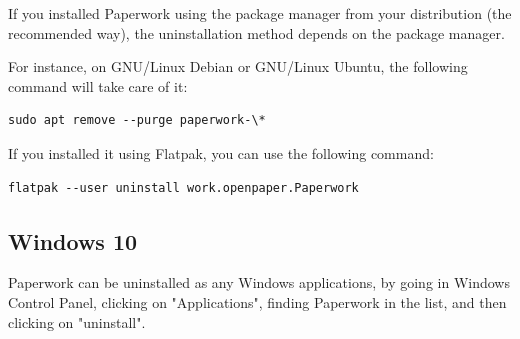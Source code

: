 \documentclass[10pt,a4paper]{article}
\begin{document}
If you installed Paperwork using the package manager from your distribution
(the recommended way), the uninstallation method depends on the package
manager.

For instance, on GNU/Linux Debian or GNU/Linux Ubuntu, the following command
will take care of it:

\begin{verbatim}
sudo apt remove --purge paperwork-\*
\end{verbatim}

If you installed it using Flatpak, you can use the following command:

\begin{verbatim}
flatpak --user uninstall work.openpaper.Paperwork
\end{verbatim}

\subsection{Windows 10}

Paperwork can be uninstalled as any Windows applications, by going in
Windows Control Panel, clicking on "Applications", finding Paperwork in the
list, and then clicking on "uninstall".
\end{document}
